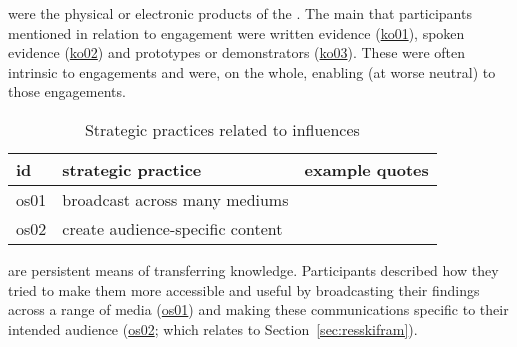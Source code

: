 \skiobje{} were the physical or electronic products of the \skiknow. The main \skiobje{} that participants mentioned in relation to \SPI{} engagement were written evidence (\hyperref[tab:resskiobje]{ko01}), spoken evidence (\hyperref[tab:resskiobje]{ko02}) and prototypes or demonstrators (\hyperref[tab:resskiobje]{ko03}). These \skiobje{} were often intrinsic to engagements and were, on the whole, enabling (at worse neutral) to those engagements.

\begin{table}[!ht]
\footnotesize
\caption{Strategic practices related to \skiobje{} influences}\label{tab:resskiobjestrat}
\begin{tabular}{L{.06\linewidth}L{.3\linewidth}L{.64\linewidth}} \hline
\textbf{id} & \textbf{strategic practice} & \textbf{example quotes} \\ \hline \hline
os01 & broadcast across many mediums & 
\vfill {} \\[5mm]
os02 & create audience-specific content & 
\vfill {} \\[5mm]
\hline
 \end{tabular}
\end{table}

\skiobje{} are persistent means of transferring knowledge. Participants described how they tried to make them more accessible and useful by broadcasting their findings across a range of media (\hyperref[tab:resskiobjestrat]{os01}) and making these communications specific to their intended audience (\hyperref[tab:resskiobjestrat]{os02}; which relates to \skifram{} Section~\ref{sec:resskifram}).

\section{\titscip}\label{sec:resskiscip}

